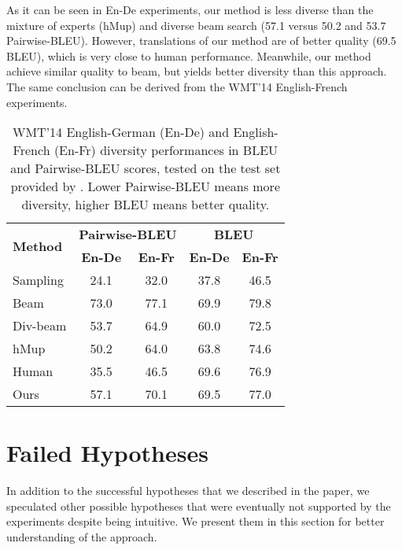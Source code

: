 \documentclass{article}
\begin{document}
{As it can be seen in En-De experiments, our method is less diverse than the mixture of experts (hMup) \citep{mixture_model_nmt_shen2019} and diverse beam search \citep{diverse_beamli2016simple} (57.1 versus 50.2 and 53.7 Pairwise-BLEU). However, translations of our method are of better quality (69.5 BLEU), which is very close to human performance. Meanwhile, our method achieve similar quality to beam, but yields better diversity than this approach. The same conclusion can be derived from the WMT'14 English-French experiments.}





\begin{table}[t]
\begin{center}
\caption{{WMT'14 English-German (En-De) and English-French (En-Fr) diversity performances in BLEU and Pairwise-BLEU scores, tested on the test set provided by \citet{mixture_model_nmt_shen2019}.} Lower Pairwise-BLEU means more diversity, higher BLEU means better quality.}
\begin{tabular}{lcccc}
\toprule
\multirow{2}{*}{\bf Method}   & \multicolumn{2}{c}{\bf Pairwise-BLEU}  & \multicolumn{2}{c}{\bf BLEU}\\
\cmidrule{2-5}
                           & \textbf{En-De} & \textbf{En-Fr}    & \textbf{En-De} & \textbf{En-Fr}\\
\midrule
Sampling            & 24.1 & 32.0  & 37.8 & 46.5 \\
Beam                & 73.0 & 77.1  & 69.9 & 79.8 \\
Div-beam            & 53.7 & 64.9  & 60.0 & 72.5 \\
hMup                & 50.2 & 64.0  & 63.8 & 74.6 \\
\midrule
Human               & 35.5 & 46.5  & 69.6 & 76.9 \\
\midrule
Ours                & 57.1 & 70.1  & 69.5 & 77.0  \\
\bottomrule
\end{tabular}
\label{table:diversity}
\end{center}
\end{table}


\section{Failed Hypotheses}\label{app:failed_hypo}
In addition to the successful hypotheses that we described in the paper, we speculated other possible hypotheses that were eventually not supported by the experiments despite being intuitive. We present them in this section for better understanding of the approach.
\end{document}
